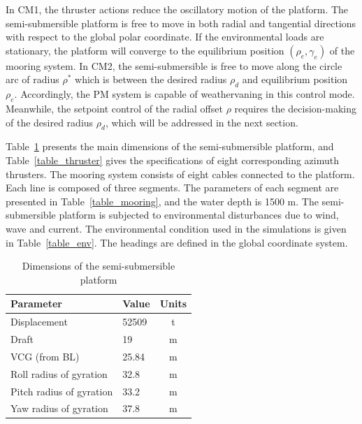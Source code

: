 \begin{sloppypar}
In CM1, the thruster actions reduce the oscillatory motion of the platform. The semi-submersible platform is free to move in both radial and tangential directions with respect to the global polar coordinate. If the environmental loads are stationary, the platform will converge to the equilibrium position $(\rho_e, \gamma_e)$ of the mooring system. In CM2, the semi-submersible is free to move along the circle arc of radius $\rho^*$ which is between the desired radius $\rho_d$ and equilibrium position $\rho_e$. Accordingly, the PM system is capable of weathervaning in this control mode. Meanwhile, the setpoint control of the radial offset $\rho$ requires the decision-making of the desired radius $\rho_d$, which will be addressed in the next section.

Table~\ref{table_dimension} presents the main dimensions of the semi-submersible platform, and Table~\ref{table_thruster} gives the specifications of eight  corresponding azimuth thrusters. The mooring system consists of eight cables connected to the platform. Each line is composed of three segments. The parameters of each segment are presented in Table~\ref{table_mooring}, and the water depth is 1500 m. The semi-submersible platform is subjected to environmental disturbances due to wind, wave and current. The environmental condition used in the simulations is given in Table~\ref{table_env}. The headings are defined in the global coordinate system.

\begin{table}[ht!]
	\caption{Dimensions of the semi-submersible platform}
	\begin{center}
		\label{table_dimension}
		\begin{tabular}{l l c}
			\hline
			Parameter & Value & Units \\
			\hline
			Displacement & 52509 & t \\
			Draft & 19 & m \\
			VCG (from BL) & 25.84 & m \\
			Roll radius of gyration & 32.8 & m \\
			Pitch radius of gyration & 33.2 & m \\
			Yaw radius of gyration & 37.8 & m \\
			\hline
		\end{tabular}
	\end{center}
\end{table}


\end{sloppypar}
